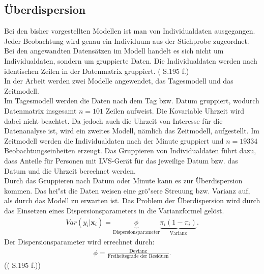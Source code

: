 \documentclass[12pt]{scrreprt}
\begin{document}
\subsection{Überdispersion}
Bei den bisher vorgestellten Modellen ist man von Individualdaten ausgegangen. Jeder Beobachtung wird genau ein Individuum aus der Stichprobe zugeordnet.
Bei den angewandten Datensätzen im Modell handelt es sich nicht um Individualdaten, sondern um gruppierte Daten. Die Individualdaten werden nach identischen Zeilen in der Datenmatrix gruppiert. (\cite{fahrmeir2007regression} S.195 f.) \\ 
In der Arbeit werden zwei Modelle angewendet, das Tagesmodell und das Zeitmodell. \\
Im Tagesmodell werden die Daten nach dem Tag bzw. Datum gruppiert, wodurch Datenmatrix insgesamt $n = 101$ Zeilen aufweist. Die Kovariable Uhrzeit wird dabei nicht beachtet. Da jedoch auch die Uhrzeit von Interesse für die Datenanalyse ist, wird ein zweites Modell, nämlich das Zeitmodell, aufgestellt. Im Zeitmodell werden die Individualdaten nach der Minute gruppiert und $n = 19334$ Beobachtungseinheiten erzeugt. Das Gruppieren von Individualdaten führt dazu, dass Anteile für Personen mit LVS-Gerät für das jeweilige Datum bzw. das Datum und die Uhrzeit berechnet werden. \\
Durch das Gruppieren nach Datum oder Minute kann es zur Überdispersion kommen. Das hei"st die Daten weisen eine grö"sere Streuung bzw. Varianz auf, als durch das Modell zu erwarten ist. Das Problem der Überdispersion wird durch das Einsetzen eines Dispersionsparameters in die Varianzformel gelöst.
\begin{align}
Var(y_{i}|\textbf{x}_{i})=\underbrace{\phi}_\text{Dispersionsparameter} \underbrace{\pi_{i}(1-\pi_{i})}_\text{Varianz}.
\end{align}
Der Dispersionsparameter wird errechnet durch:
\begin{align}
\phi=\frac{\text{Devianz}}{\text{Freiheitsgrade der Residuen}}.
\end{align} 
({(\cite{fahrmeir2007regression} S.195 f.)})
\end{document}

